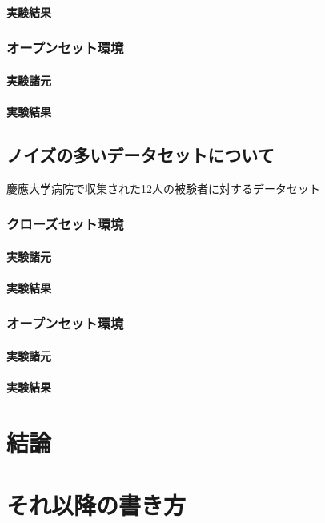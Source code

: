 \subsubsection{実験結果}
\subsection{オープンセット環境}
\subsubsection{実験諸元}
\subsubsection{実験結果}


\section{ノイズの多いデータセットについて}
慶應大学病院で収集された12人の被験者に対するデータセット
\subsection{クローズセット環境}
\subsubsection{実験諸元}
\subsubsection{実験結果}
\subsection{オープンセット環境}
\subsubsection{実験諸元}
\subsubsection{実験結果}


\chapter{結論}

\chapter{それ以降の書き方}
